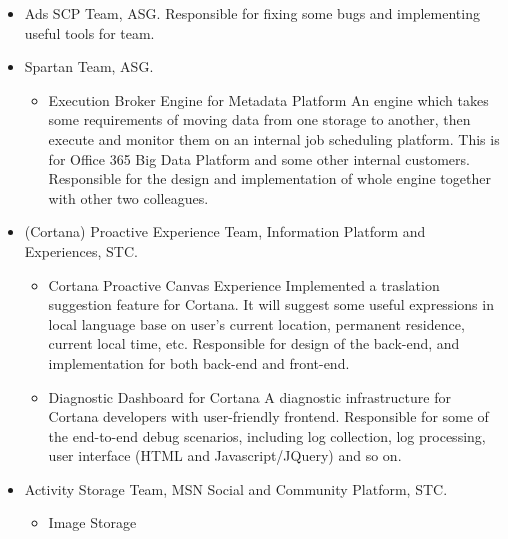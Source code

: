 \documentclass[10pt,a4paper,roman]{moderncv} %
\begin{document}
        {\begin{itemize}%
         \item Ads SCP Team, ASG.
               Responsible for fixing some bugs and implementing useful tools for team.
         \item Spartan Team, ASG.
               \begin{itemize}%
               \item Execution Broker Engine for Metadata Platform\newline{}%
                     An engine which takes some requirements of moving data from one storage to another, then execute and monitor them on an internal job scheduling platform. This is for Office 365 Big Data Platform and some other internal customers.\newline{}%
                     Responsible for the design and implementation of whole engine together with other two colleagues.
               \end{itemize}
         \item (Cortana) Proactive Experience Team, Information Platform and Experiences, STC.
               \begin{itemize}%
               \item Cortana Proactive Canvas Experience\newline{}%
                     Implemented a traslation suggestion feature for Cortana. It will suggest some useful expressions in local language base on user's current location, permanent residence, current local time, etc.\newline{}%
                     Responsible for design of the back-end, and implementation for both back-end and front-end.
               \item Diagnostic Dashboard for Cortana\newline{}%
                     A diagnostic infrastructure for Cortana developers with user-friendly frontend.\newline{}%
                     Responsible for some of the end-to-end debug scenarios, including log collection, log processing, user interface (HTML and Javascript/JQuery) and so on.
               \end{itemize}
         \item Activity Storage Team, MSN Social and Community Platform, STC.
               \begin{itemize}%
               \item Image Storage\newline{}%

\end{itemize}
\end{itemize}}
\end{document}
